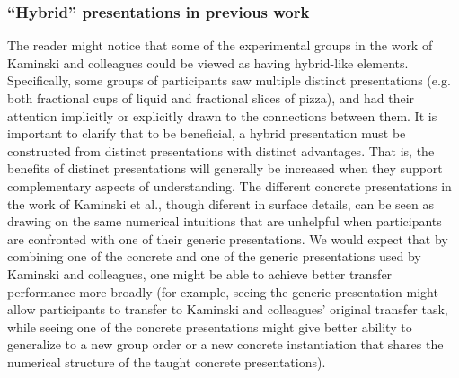 \documentclass[man,mask,10pt]{apa6}
\begin{document}
\subsubsection{``Hybrid'' presentations in previous work}
The reader might notice that some of the experimental groups in the work of Kaminski and colleagues could be viewed as having hybrid-like elements. Specifically, some groups of participants saw multiple distinct presentations (e.g. both fractional cups of liquid and fractional slices of pizza), and had their attention implicitly or explicitly drawn to the connections between them. It is important to clarify that to be beneficial, a hybrid presentation must be constructed from distinct presentations with distinct advantages. That is, the benefits of distinct presentations will generally be increased when they support complementary aspects of understanding. The different concrete presentations in the work of Kaminski et al., though diferent in surface details, can be seen as drawing on the same numerical intuitions that are unhelpful when participants are confronted with one of their generic presentations. We would expect that by combining one of the concrete and one of the generic presentations used by Kaminski and colleagues, one might be able to achieve better transfer performance more broadly (for example, seeing the generic presentation might allow participants to transfer to Kaminski and colleagues' original transfer task, while seeing one of the concrete presentations might give better ability to generalize to a new group order or a new concrete instantiation that shares the numerical structure of the taught concrete presentations).  
\end{document}
